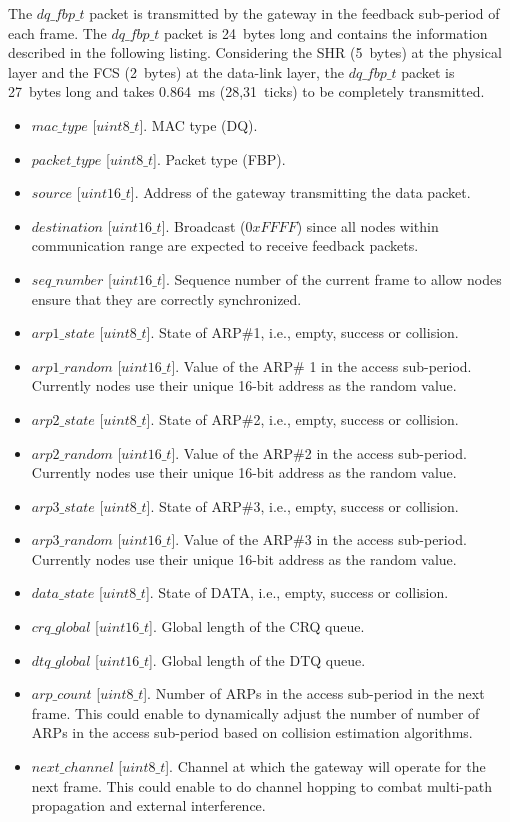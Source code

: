 The $dq\_fbp\_t$ packet is transmitted by the gateway in the feedback sub-period of each frame. The $dq\_fbp\_t$ packet is 24~bytes long and contains the information described in the following listing. Considering the SHR (5~bytes) at the physical layer and the FCS (2~bytes) at the data-link layer, the $dq\_fbp\_t$ packet is 27~bytes long and takes 0.864~ms (28,31~ticks) to be completely transmitted.
\begin{itemize}
\item $mac\_type$ [$uint8\_t$]. MAC type (DQ).
\item $packet\_type$ [$uint8\_t$]. Packet type (FBP).
\item $source$ [$uint16\_t$]. Address of the gateway transmitting the data packet.
\item $destination$ [$uint16\_t$]. Broadcast ($0xFFFF$) since all nodes within communication range are expected to receive feedback packets.
\item $seq\_number$ [$uint16\_t$]. Sequence number of the current frame to allow nodes ensure that they are correctly synchronized.
\item $arp1\_state$ [$uint8\_t$]. State of ARP\#1, i.e., empty, success or collision.
\item $arp1\_random$ [$uint16\_t$]. Value of the ARP\# 1 in the access sub-period. Currently nodes use their unique 16-bit address as the random value.
\item $arp2\_state$ [$uint8\_t$]. State of ARP\#2, i.e., empty, success or collision.
\item $arp2\_random$ [$uint16\_t$]. Value of the ARP\#2 in the access sub-period. Currently nodes use their unique 16-bit address as the random value.
\item $arp3\_state$ [$uint8\_t$]. State of ARP\#3, i.e., empty, success or collision.
\item $arp3\_random$ [$uint16\_t$]. Value of the ARP\#3 in the access sub-period. Currently nodes use their unique 16-bit address as the random value.
\item $data\_state$ [$uint8\_t$]. State of DATA, i.e., empty, success or collision.
\item $crq\_global$ [$uint16\_t$]. Global length of the CRQ queue.
\item $dtq\_global$ [$uint16\_t$]. Global length of the DTQ queue.
\item $arp\_count$ [$uint8\_t$]. Number of ARPs in the access sub-period in the next frame. This could enable to dynamically adjust the number of number of ARPs in the access sub-period based on collision estimation algorithms.
\item $next\_channel$ [$uint8\_t$]. Channel at which the gateway will operate for the next frame. This could enable to do channel hopping to combat multi-path propagation and external interference.
\end{itemize}

